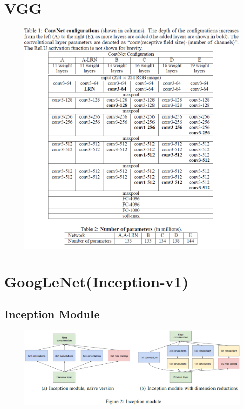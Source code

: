 \section{VGG}
\begin{figure}[H]
    \centering
    \includegraphics[width=16cm]{images/models/vgg.png}
    \label{fig:vgg}
\end{figure}

\section{GoogLeNet(Inception-v1)}
\subsection{Inception Module}
\begin{figure}[H]
    \centering
    \includegraphics[width=14cm]{images/models/inception_module.png}
    \label{fig:inception_module}
\end{figure}

